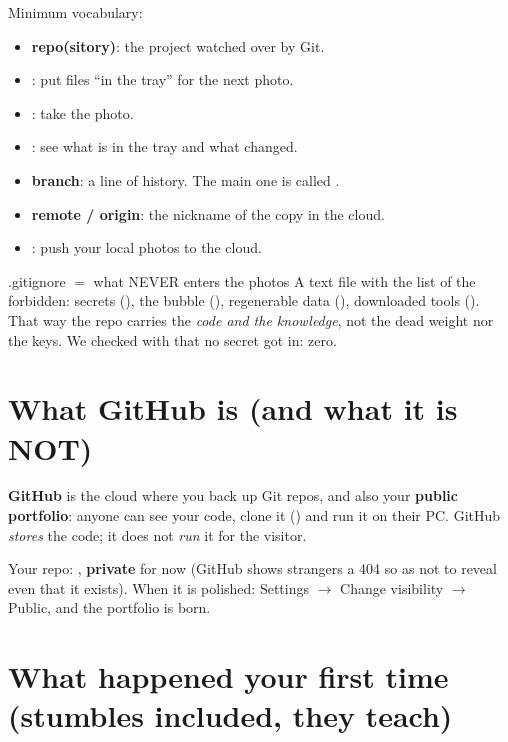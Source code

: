 \documentclass[11pt,a4paper]{article}
\begin{document}
Minimum vocabulary:
\begin{itemize}
  \item \textbf{repo(sitory)}: the project watched over by Git.
  \item {}: put files ``in the tray'' for the next photo.
  \item {}: take the photo.
  \item {}: see what is in the tray and what changed.
  \item \textbf{branch}: a line of history. The main one is called .
  \item \textbf{remote / origin}: the nickname of the copy in the cloud.
  \item {}: push your local photos to the cloud.
\end{itemize}

\begin{concepto}{.gitignore $=$ what NEVER enters the photos}
A text file with the list of the forbidden: secrets (), the bubble
(), regenerable data (), downloaded tools ().
That way the repo carries the \emph{code and the knowledge}, not the dead weight nor the keys.
We checked with  that no secret got in: zero.
\end{concepto}

\section{What GitHub is (and what it is NOT)}

\textbf{GitHub} is the cloud where you back up Git repos, and also your \textbf{public
portfolio}: anyone can see your code, clone it () and run it on their PC.
GitHub \emph{stores} the code; it does not \emph{run} it for the visitor.

Your repo: , \textbf{private} for now (GitHub shows
strangers a 404 so as not to reveal even that it exists). When it is polished:
Settings $\rightarrow$ Change visibility $\rightarrow$ Public, and the portfolio is born.

\section{What happened your first time (stumbles included, they teach)}
\end{document}
